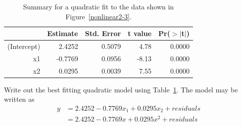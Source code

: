 \begin{table}
\centering
\begin{tabular}{rrrrr}
  \hline
 & Estimate & Std. Error & t value & Pr($>$$|$t$|$) \\ 
  \hline
(Intercept) & 2.4252 & 0.5079 & 4.78 & 0.0000 \\ 
  x1  & -0.7769 & 0.0956 & -8.13 & 0.0000 \\ 
  x2  & 0.0295 & 0.0039 & 7.55 & 0.0000 \\ 
   \hline
\end{tabular}
\caption{Summary for a quadratic fit to the data shown in Figure~\ref{nonlinear2-3}.}
\label{nonlinear2-quadfitsummary}
\end{table}

\begin{example}{Write out the best fitting quadratic model using Table~\ref{nonlinear2-quadfitsummary}.}
The model may be written as
\begin{align*}
y &= 2.4252 - 0.7769x_1 + 0.0295x_2 + residuals \\
	&= 2.4252 - 0.7769x + 0.0295x^2 + residuals
\end{align*}
\end{example}

